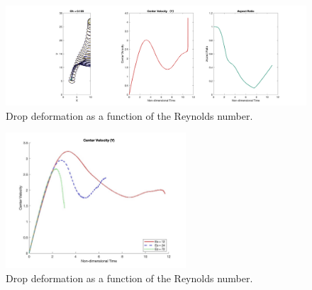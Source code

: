 \documentclass[12pt]{article}
\begin{document}
\begin{figure}[H]
    \centering
    \includegraphics[width=\textwidth]{Latex/figures/All_Oh=1.25_t=0.44.png}
    \caption{Drop deformation as a function of the Reynolds number.}
    \label{deformation}
\end{figure}



\begin{figure}[H]
    \centering
    \includegraphics[width=0.6\textwidth]{Latex/figures/velocity_profile_compare.jpg}
    \caption{Drop deformation as a function of the Reynolds number.}
    \label{deformation}
\end{figure}






\end{document}
